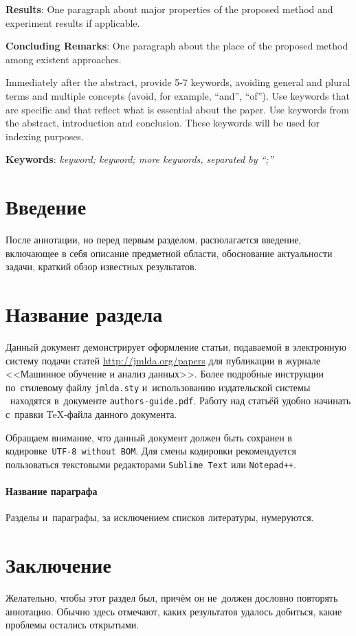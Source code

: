 \documentclass[12pt, twoside]{article}
\begin{document}
{	\noindent
	\textbf{Results}: One paragraph about major properties of the proposed method and experiment results if applicable.
	
	\noindent
	\textbf{Concluding Remarks}: One paragraph about the place of the proposed method among existent approaches.
		
	\noindent
	Immediately after the abstract, provide 5-7 keywords, avoiding general and plural terms and multiple concepts (avoid, for example, ``and'', ``of'').
	Use keywords that are specific and that reflect what is essential about the paper.
	Use keywords from the abstract, introduction and conclusion.
	These keywords will be used for indexing purposes.
		
	\noindent
    	\textbf{Keywords}: \emph{keyword; keyword; more keywords, separated by ``;''}}


\maketitle
\linenumbers

\section{Введение}
После аннотации, но перед первым разделом,
располагается введение, включающее в себя
описание предметной области,
обоснование актуальности задачи,
краткий обзор известных результатов.

\section{Название раздела}
Данный документ демонстрирует оформление статьи,
подаваемой в электронную систему подачи статей \url{http://jmlda.org/papers} для публикации в журнале <<Машинное обучение и анализ данных>>.
Более подробные инструкции по~стилевому файлу \texttt{jmlda.sty} и~использованию издательской системы \LaTeXe\
находятся в~документе \texttt{authors-guide.pdf}.
Работу над статьёй удобно начинать с~правки \TeX-файла данного документа.

Обращаем внимание, что данный документ должен быть сохранен в кодировке~\verb'UTF-8 without BOM'.
Для смены кодировки рекомендуется пользоваться текстовыми редакторами \verb'Sublime Text' или \verb'Notepad++'.

\paragraph{Название параграфа}
Разделы и~параграфы, за исключением списков литературы, нумеруются.

\section{Заключение}
Желательно, чтобы этот раздел был, причём он не~должен дословно повторять аннотацию.
Обычно здесь отмечают, каких результатов удалось добиться, какие проблемы остались открытыми.
\end{document}
